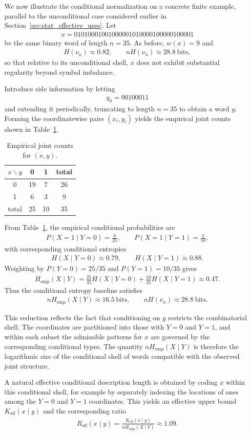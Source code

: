 \documentclass[12pt]{article}
\newcommand{\be}{\begin{eqnarray}}
\newcommand{\ee}{\end{eqnarray}}
\begin{document}
We now illustrate the conditional normalization on a concrete finite example,
parallel to the unconditional case considered earlier in Section~\ref{sec:stat_effective_uses}. Let
\be
x=01010001001000001010000100000100001
\label{eq:x_example}
\ee
be the same binary word of length $n=35$. As before, $w(x)=9$ and
\be
H(\nu_n)\approx0.82,
\qquad
nH(\nu_n)\approx28.8\ \text{bits},
\ee
so that relative to its unconditional shell, $x$ does not exhibit substantial
regularity beyond symbol imbalance.

Introduce side information by letting
\be
y_0=00100011
\label{eq:y0_example}
\ee
and extending it periodically, truncating to length $n=35$ to obtain a word
$y$. Forming the coordinatewise pairs $(x_i,y_i)$ yields the empirical joint
counts shown in Table~\ref{tab:jointxy}.

\begin{table}[h]
\centering
\begin{tabular}{c|cc|c}
$x\backslash y$ & 0 & 1 & total \\
\hline
0 & 19 & 7 & 26 \\
1 & 6  & 3 & 9 \\
\hline
total & 25 & 10 & 35
\end{tabular}
\caption{Empirical joint counts for $(x,y)$.}
\label{tab:jointxy}
\end{table}

From Table~\ref{tab:jointxy}, the empirical conditional probabilities are
\be
P(X=1\mid Y=0)=\frac{6}{25},
\qquad
P(X=1\mid Y=1)=\frac{3}{10},
\ee
with corresponding conditional entropies
\be
H(X\mid Y=0)\approx0.79,
\qquad
H(X\mid Y=1)\approx0.88.
\ee
Weighting by $P(Y=0)=25/35$ and $P(Y=1)=10/35$ gives
\be
H_{\mathrm{emp}}(X\mid Y)
=
\frac{25}{35}H(X\mid Y=0)+\frac{10}{35}H(X\mid Y=1)
\approx0.47.
\ee
Thus the conditional entropy baseline satisfies
\be
nH_{\mathrm{emp}}(X\mid Y)\approx16.5\ \text{bits},
\qquad
nH(\nu_n)\approx28.8\ \text{bits}.
\ee

This reduction reflects the fact that conditioning on $y$ restricts the
combinatorial shell. The coordinates are partitioned into those with $Y=0$ and
$Y=1$, and within each subset the admissible patterns for $x$ are governed by
the corresponding conditional types. The quantity $nH_{\mathrm{emp}}(X\mid Y)$
is therefore the logarithmic size of the conditional shell of words compatible
with the observed joint structure.

A natural effective conditional description length is obtained by coding $x$
within this conditional shell, for example by separately indexing the locations
of ones among the $Y=0$ and $Y=1$ coordinates. This yields an effective upper
bound $K_{\mathrm{eff}}(x\mid y)$ and the corresponding ratio
\be
R_{\mathrm{eff}}(x\mid y)
=
\frac{K_{\mathrm{eff}}(x\mid y)}{nH_{\mathrm{emp}}(X\mid Y)}
\approx1.09.
\ee
\end{document}
